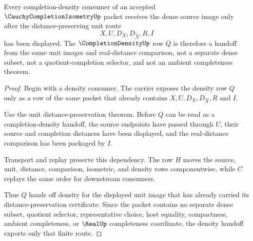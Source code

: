 \begin{theorem}
\label{thm:cauchy-completion-isometry-density-handoff}
Every completion-density consumer of an accepted $\CauchyCompletionIsometryUp$ packet receives the dense source image only after the distance-preserving unit route
$$
X,U,D_X,D_{\widehat X},R,I
$$
has been displayed. The $\CompletionDensityUp$ row $Q$ is therefore a handoff from the same unit images and real-distance comparison, not a separate dense subset, not a quotient-completion selector, and not an ambient completeness theorem.
\end{theorem}
\begin{proof}
Begin with a density consumer. The carrier exposes the density row $Q$ only as a row of the same packet that already contains $X,U,D_X,D_{\widehat X},R$ and $I$.

Use the unit distance-preservation theorem. Before $Q$ can be read as a completion-density handoff, the source endpoints have passed through $U$, their source and completion distances have been displayed, and the real-distance comparison has been packaged by $I$.

Transport and replay preserve this dependency. The row $H$ moves the source, unit, distance, comparison, isometric, and density rows componentwise, while $C$ replays the same order for downstream consumers.

Thus $Q$ hands off density for the displayed unit image that has already carried its distance-preservation certificate. Since the packet contains no separate dense subset, quotient selector, representative choice, host equality, compactness, ambient completeness, or $\RealUp$ completeness coordinate, the density handoff exports only that finite route.
\end{proof}


\begin{closurestatus}{\CauchyCompletionIsometryUp}
  \theoryclosure{\seedClosure}
  \formalstatus{\unformalizedV}
\end{closurestatus}
